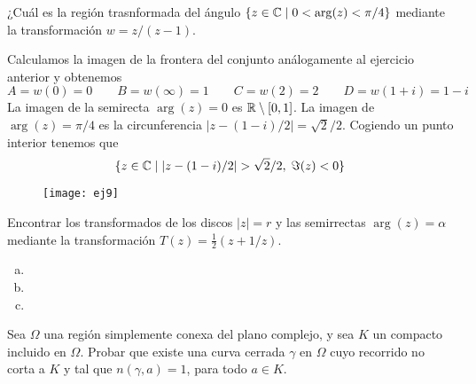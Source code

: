 \documentclass[twoside]{article}
\begin{document}
\begin{ejercicio}{9}
¿Cuál es la región trasnformada del ángulo $\{z\in \mathbb{C}\mid 0<\arg(z)<\pi/4\}$ mediante la transformación $w=z/(z-1)$.
\end{ejercicio}
\begin{solucion}
Calculamos la imagen de la frontera del conjunto análogamente al ejercicio anterior y obtenemos
$$
A = w(0)= 0 \qquad B=w(\infty)=1 \qquad C= w(2)=2 \qquad D =w(1+i) = 1-i 
$$
La imagen de la semirecta $\arg(z)=0$ es $\mathbb{R}\setminus[0,1]$. La imagen de $\arg(z)=\pi/4$ es la circunferencia $|z-(1-i)/2|=\sqrt{2}/2$. Cogiendo un punto interior tenemos que
$$
\{z\in \C \mid |z-(1-i)/2|>\sqrt{2}/2, \;\Im(z)<0\}
$$
\begin{figure}[h]
\texttt{[image: ej9]}
\centering
\end{figure}
\end{solucion}
\newpage

\begin{ejercicio}{10}
Encontrar los transformados de los discos $|z|=r$ y las semirrectas $\arg(z)=\alpha$ mediante la transformación $T(z)=\frac{1}{2}(z+1/z)$.
\end{ejercicio}
\begin{solucion}
\begin{enumerate}[(a)]
\item[]
\item 
\item 
\end{enumerate}
\end{solucion}
\newpage

\begin{ejercicio}{11}
Sea $\Omega$ una región simplemente conexa del plano complejo, y sea $K$ un compacto incluido en $\Omega$. Probar que existe una curva cerrada $\gamma$ en $\Omega$ cuyo recorrido no corta a $K$ y tal que $n(\gamma,a)=1$, para todo $a\in K$.
\end{ejercicio}
\begin{solucion}
\end{solucion}
\newpage
\end{document}
